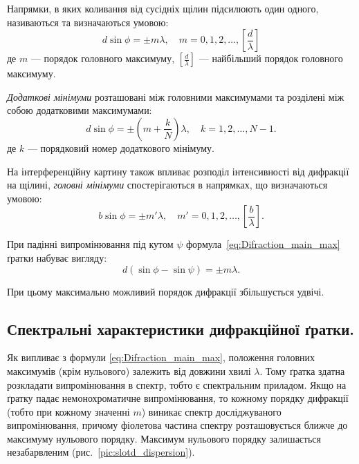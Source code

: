Напрямки, в яких коливання від сусідніх щілин підсилюють один одного, називаються  та визначаються умовою:
\begin{equation}\label{eq:Difraction_main_max}
    d\sin\phi=\pm m\lambda, \quad m = 0, 1, 2, \ldots, \left[\frac{d}{\lambda}\right]
\end{equation}
де $m$ --- порядок головного максимуму,  $\left[\frac{d}{\lambda}\right]$ --- найбільший порядок головного максимуму.

\emph{Додаткові мінімуми} розташовані між головними максимумами та розділені між собою додатковими максимумами:
\begin{equation}\label{eq:Difraction_add_min}
    d\sin\phi=\pm\left(m + \frac{k}{N}\right) \lambda, \quad k = 1, 2, \ldots, N - 1.
\end{equation}
де $k$ --- порядковий номер додаткового мінімуму.

На інтерференційну картину також впливає розподіл інтенсивності від дифракції на щілині, \emph{головні мінімуми} спостерігаються в напрямках, що визначаються умовою:
\begin{equation}\label{eq:Difraction_main_min}
    b\sin\phi= \pm m'\lambda, \quad m' = 0, 1, 2, \ldots, \left[ \frac{b}{\lambda}\right].
\end{equation}

При падінні випромінювання під кутом $ \psi $ формула~\eqref{eq:Difraction_main_max} ґратки набуває вигляду:
\begin{equation}\label{key}
    d(\sin\phi - \sin\psi) = \pm m \lambda.
\end{equation}

При цьому максимально можливий порядок дифракції збільшується удвічі.

\subsection*{Спектральні характеристики дифракційної ґратки.}

Як випливає з формули \eqref{eq:Difraction_main_max}, положення головних максимумів (крім нульового) залежить від довжини хвилі $\lambda$. Тому ґратка здатна розкладати випромінювання в спектр, тобто є спектральним приладом. Якщо на ґратку падає немонохроматичне випромінювання, то кожному порядку дифракції (тобто при кожному значенні $m$) виникає спектр досліджуваного випромінювання, причому фіолетова частина спектру розташовується ближче до максимуму нульового порядку. Максимум нульового порядку залишається незабарвленим (рис.~\ref{pic:slotd_dispersion}).



